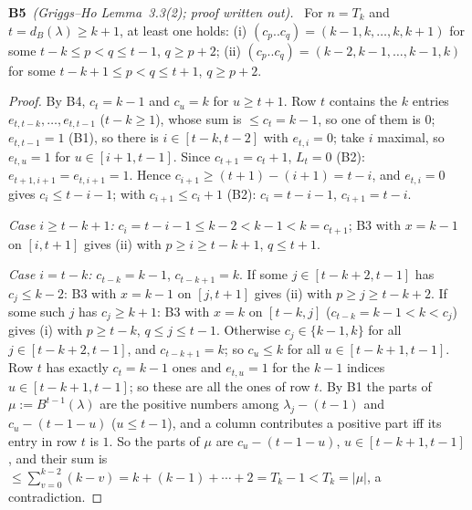 \documentclass[11pt]{article}
\newcommand{\step}[2]{\par\medskip\noindent\textbf{#1}\ \textit{#2}\ }
\newcommand{\dB}{d_B}
\begin{document}
\step{B5}{(Griggs--Ho Lemma~3.3(2); proof written out).} For $n=T_k$ and $t=\dB(\lambda)\ge k+1$, at least one holds:
(i) $(c_p..c_q)=(k-1,k,\ldots,k,k+1)$ for some $t-k\le p<q\le t-1$, $q\ge p+2$;
(ii) $(c_p..c_q)=(k-2,k-1,\ldots,k-1,k)$ for some $t-k+1\le p<q\le t+1$, $q\ge p+2$.
\begin{proof} By B4, $c_t=k-1$ and $c_u=k$ for $u\ge t+1$. Row $t$ contains the $k$ entries $e_{t,t-k},\ldots,e_{t,t-1}$ ($t-k\ge1$), whose sum is $\le c_t=k-1$, so one of them is $0$; $e_{t,t-1}=1$ (B1), so there is $i\in[t-k,t-2]$ with $e_{t,i}=0$; take $i$ maximal, so $e_{t,u}=1$ for $u\in[i+1,t-1]$. Since $c_{t+1}=c_t+1$, $L_t=0$ (B2): $e_{t+1,i+1}=e_{t,i+1}=1$. Hence $c_{i+1}\ge(t+1)-(i+1)=t-i$, and $e_{t,i}=0$ gives $c_i\le t-i-1$; with $c_{i+1}\le c_i+1$ (B2): $c_i=t-i-1$, $c_{i+1}=t-i$.

\emph{Case $i\ge t-k+1$:} $c_i=t-i-1\le k-2<k-1<k=c_{t+1}$; B3 with $x=k-1$ on $[i,t+1]$ gives (ii) with $p\ge i\ge t-k+1$, $q\le t+1$.

\emph{Case $i=t-k$:} $c_{t-k}=k-1$, $c_{t-k+1}=k$. If some $j\in[t-k+2,t-1]$ has $c_j\le k-2$: B3 with $x=k-1$ on $[j,t+1]$ gives (ii) with $p\ge j\ge t-k+2$. If some such $j$ has $c_j\ge k+1$: B3 with $x=k$ on $[t-k,j]$ ($c_{t-k}=k-1<k<c_j$) gives (i) with $p\ge t-k$, $q\le j\le t-1$. Otherwise $c_j\in\{k-1,k\}$ for all $j\in[t-k+2,t-1]$, and $c_{t-k+1}=k$; so $c_u\le k$ for all $u\in[t-k+1,t-1]$. Row $t$ has exactly $c_t=k-1$ ones and $e_{t,u}=1$ for the $k-1$ indices $u\in[t-k+1,t-1]$; so these are all the ones of row $t$. By B1 the parts of $\mu:=B^{t-1}(\lambda)$ are the positive numbers among $\lambda_j-(t-1)$ and $c_u-(t-1-u)$ ($u\le t-1$), and a column contributes a positive part iff its entry in row $t$ is $1$. So the parts of $\mu$ are $c_u-(t-1-u)$, $u\in[t-k+1,t-1]$, and their sum is $\le\sum_{v=0}^{k-2}(k-v)=k+(k-1)+\cdots+2=T_k-1<T_k=|\mu|$, a contradiction.
\end{proof}
\end{document}
